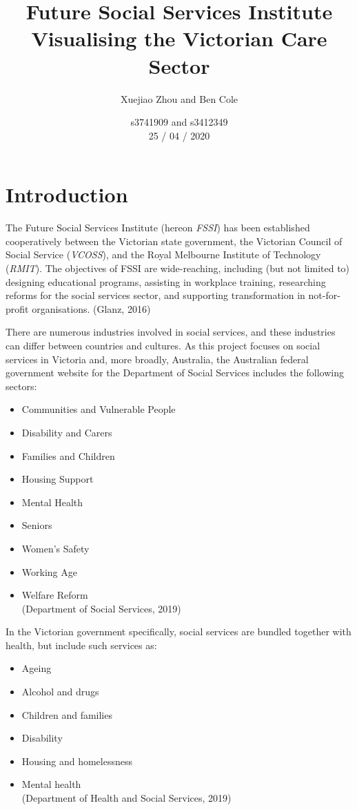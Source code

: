 \documentclass[11pt,]{article}
\title{Future Social Services Institute\\
Visualising the Victorian Care Sector}
\author{Xuejiao Zhou and Ben Cole}
\date{s3741909 and s3412349\\
25 / 04 / 2020}
\providecommand{\tightlist}{%
  \setlength{\itemsep}{0pt}\setlength{\parskip}{0pt}}
\begin{document}
\maketitle

{
\setcounter{tocdepth}{2}
\tableofcontents
}
\newpage

\twocolumn

\section{Introduction}\label{introduction}

The Future Social Services Institute (hereon \emph{FSSI}) has been
established cooperatively between the Victorian state government, the
Victorian Council of Social Service (\emph{VCOSS}), and the Royal
Melbourne Institute of Technology (\emph{RMIT}). The objectives of FSSI
are wide-reaching, including (but not limited to) designing educational
programs, assisting in workplace training, researching reforms for the
social services sector, and supporting transformation in not-for-profit
organisations. (Glanz, 2016)

There are numerous industries involved in social services, and these
industries can differ between countries and cultures. As this project
focuses on social services in Victoria and, more broadly, Australia, the
Australian federal government website for the Department of Social
Services includes the following sectors:

\begin{itemize}
\tightlist
\item
  Communities and Vulnerable People
\item
  Disability and Carers
\item
  Families and Children
\item
  Housing Support
\item
  Mental Health
\item
  Seniors
\item
  Women's Safety
\item
  Working Age
\item
  Welfare Reform\\
  (Department of Social Services, 2019)
\end{itemize}

In the Victorian government specifically, social services are bundled
together with health, but include such services as:

\begin{itemize}
\tightlist
\item
  Ageing
\item
  Alcohol and drugs
\item
  Children and families
\item
  Disability
\item
  Housing and homelessness
\item
  Mental health\\
  (Department of Health and Social Services, 2019)
\end{itemize}
\end{document}
